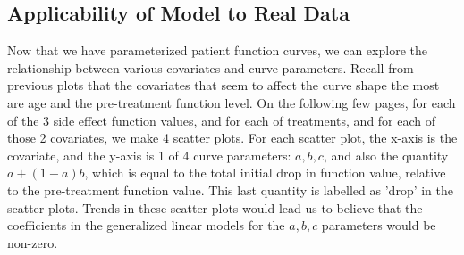 \subsection{Applicability of Model to Real Data}
Now that we have parameterized patient function curves, we can explore the relationship between various covariates and curve parameters.  Recall from previous plots that the covariates that seem to affect the curve shape the most are age and the pre-treatment function level.  On the following few pages, for each of the 3 side effect function values, and for each of treatments, and for each of those 2 covariates, we make 4 scatter plots.  For each scatter plot, the x-axis is the covariate, and the y-axis is 1 of 4 curve parameters: $a, b, c$, and also the quantity $a+(1-a)b$, which is equal to the total initial drop in function value, relative to the pre-treatment function value.  This last quantity is labelled as 'drop' in the scatter plots.  Trends in these scatter plots would lead us to believe that the coefficients in the generalized linear models for the $a, b, c$ parameters would be non-zero.

